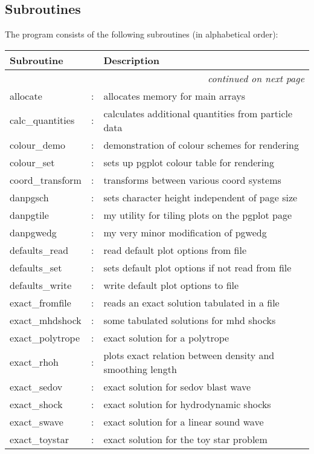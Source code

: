 \documentclass[a4paper,12pt]{article}
\begin{document}
\subsection{Subroutines}
The program consists of the following subroutines (in alphabetical order):
\begin{longtable}{|lcp{}|}
\hline
Subroutine &  & Description \\
\hline \endhead
\multicolumn{3}{|r|}{\emph{continued on next page}} \\
\hline \endfoot
\hline \endlastfoot
allocate           & : & allocates memory for main arrays \\
calc\_quantities    & : & calculates additional quantities from particle data\\
colour\_demo        & : & demonstration of colour schemes for rendering\\
colour\_set	 & : & sets up pgplot colour table for rendering\\
coord\_transform    & : & transforms between various coord systems\\
danpgsch           & : & sets character height independent of page size\\
danpgtile          & : & my utility for tiling plots on the pgplot page\\
danpgwedg          & : & my very minor modification of pgwedg\\
defaults\_read	 & : & read default plot options from file\\
defaults\_set	 & : & sets default plot options if not read from file\\
defaults\_write	 & : & write default plot options to file\\
exact\_fromfile     & : & reads an exact solution tabulated in a file\\
exact\_mhdshock     & : & some tabulated solutions for mhd shocks \\
exact\_polytrope    & : & exact solution for a polytrope\\
exact\_rhoh	 & : & plots exact relation between density and smoothing length\\
exact\_sedov        & : & exact solution for sedov blast wave\\
exact\_shock        & : & exact solution for hydrodynamic shocks\\
exact\_swave        & : & exact solution for a linear sound wave\\
exact\_toystar      & : & exact solution for the toy star problem\\

\end{longtable}
\end{document}
